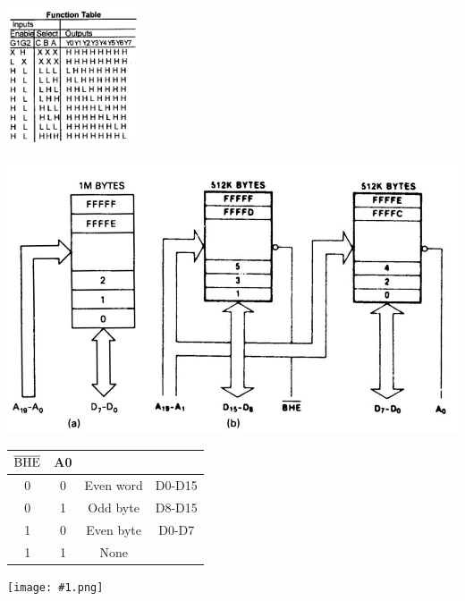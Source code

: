 \documentclass[10pt,a4paper]{article}
\def\img#1#2{\begin{tcolorbox}[title=#2]\texttt{[image: \#1.png]}\end{tcolorbox}}
\begin{document}
\begin{CJK}{UTF8}{song}
\begin{twocolumn}
\begin{tcolorbox}[title=74LS138 38译码器]
			\includegraphics[height=4cm]{38T.png}
		\end{tcolorbox}
		\begin{tcolorbox}[title=8086存储组织]
			\centering
			\includegraphics[width=\linewidth]{eobanks.png}
			\begin{tabular}{|c|c|c|c|}
				\hline
				$\rm \overline{BHE}$ & A0 &  &  \\
				\hline
				0 & 0 & Even word & D0-D15 \\
				\hline
				0 & 1 & Odd byte & D8-D15 \\
				\hline
				1 & 0 & Even byte & D0-D7 \\
				\hline
				1 & 1 & None &  \\
				\hline
			\end{tabular}
		\end{tcolorbox}
		\img{8255}{8255 外设芯片}
	\end{twocolumn}
	\end{CJK}
\end{document}
